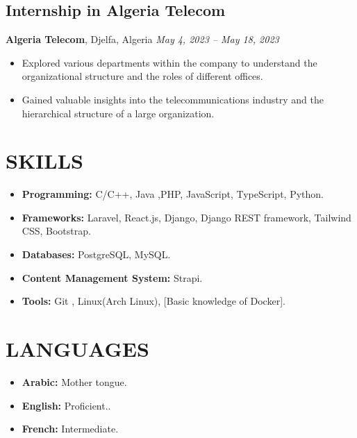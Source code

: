 \documentclass[a4paper,12pt]{article}
\begin{document}
\subsection*{Internship in Algeria Telecom}
\textbf{Algeria Telecom}, Djelfa, Algeria \hfil
\textit{May 4, 2023 – May 18, 2023} \\
\begin{itemize}
    \item Explored various departments within the company to understand the organizational structure and the roles of different offices.
    \item Gained valuable insights into the telecommunications industry and the hierarchical structure of a large organization.
\end{itemize}

\section{SKILLS}
\begin{itemize}
    \itemsep=-.3em
    \item \textbf{Programming:} C/C++, Java ,PHP, JavaScript, TypeScript, Python.
    \item \textbf{Frameworks:} Laravel, React.js, Django, Django REST framework, Tailwind CSS, Bootstrap.
    \item \textbf{Databases:} PostgreSQL, MySQL.
    \item \textbf{Content Management System:} Strapi.
    \item \textbf{Tools:} Git , Linux(Arch Linux),  [Basic knowledge of Docker].
\end{itemize}

\section{LANGUAGES}
\begin{itemize}
    \itemsep=-.3em
    \item \textbf{Arabic:} Mother tongue.
    \item \textbf{English:} Proficient..
    \item \textbf{French:} Intermediate.
\end{itemize}
\end{document}
